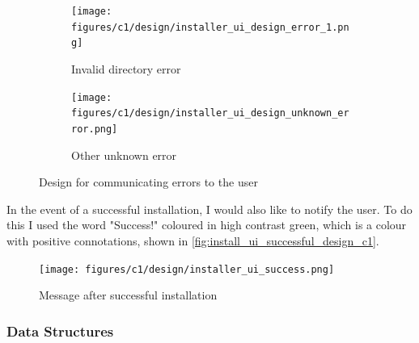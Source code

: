 \documentclass[11pt]{article}
\begin{document}
                \begin{figure}[!ht]
                    \begin{subfigure}{.5\textwidth}
                        \centering
                        \texttt{[image: figures/c1/design/installer\_ui\_design\_error\_1.png]}
                        \caption{Invalid directory error}
                        \label{fig:installer_ui_design_directory_error}
                    \end{subfigure}%
                    \begin{subfigure}{.5\textwidth}
                        \centering
                        \texttt{[image: figures/c1/design/installer\_ui\_design\_unknown\_error.png]}
                        \caption{Other unknown error}
                        \label{fig:installer_ui_design_other_error}
                    \end{subfigure}%
                    \caption{Design for communicating errors to the user}
                    \label{fig:installer_ui_design_errors_c1}
                \end{figure}

                In the event of a successful installation, I would also like to notify the user. To do this I used the word "Success!" coloured in high contrast green, which is a colour with positive connotations, shown in \autoref{fig:install_ui_successful_design_c1}.

                \begin{figure}[!ht]
                    \centering
                    \texttt{[image: figures/c1/design/installer\_ui\_success.png]}
                    \caption{Message after successful installation}
                    \label{fig:install_ui_successful_design_c1}
                \end{figure}


            \subsubsection{Data Structures}
\end{document}
